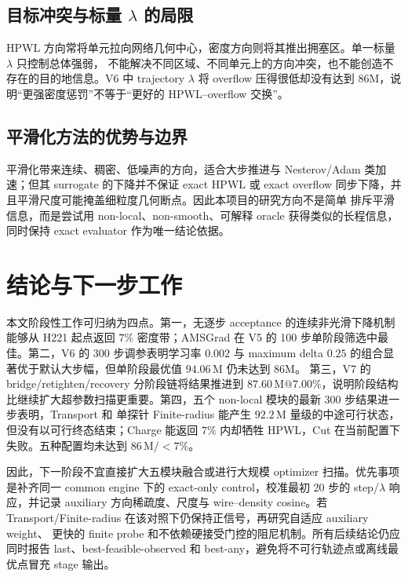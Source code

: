 \documentclass[UTF8,a4paper,11pt]{ctexart}
\begin{document}
\subsection{目标冲突与标量 \texorpdfstring{$\lambda$}{lambda} 的局限}

HPWL 方向常将单元拉向网络几何中心，密度方向则将其推出拥塞区。单一标量 $\lambda$ 只控制总体强弱，
不能解决不同区域、不同单元上的方向冲突，也不能创造不存在的目的地信息。V6 中 trajectory $\lambda$ 将
overflow 压得很低却没有达到 86M，说明“更强密度惩罚”不等于“更好的 HPWL--overflow 交换”。

\subsection{平滑化方法的优势与边界}

平滑化带来连续、稠密、低噪声的方向，适合大步推进与 Nesterov/Adam 类加速；但其 surrogate 的下降并不保证
exact HPWL 或 exact overflow 同步下降，并且平滑尺度可能掩盖细粒度几何断点。因此本项目的研究方向不是简单
排斥平滑信息，而是尝试用 non-local、non-smooth、可解释 oracle 获得类似的长程信息，同时保持 exact evaluator
作为唯一结论依据。

\section{结论与下一步工作}

本文阶段性工作可归纳为四点。第一，无逐步 acceptance 的连续非光滑下降机制能够从 H221 起点返回 $7\%$
密度带；AMSGrad 在 V5 的 100 步单阶段筛选中最佳。第二，V6 的 300 步调参表明学习率 $0.002$ 与
maximum delta $0.25$ 的组合显著优于默认大步幅，但单阶段最优值 $94.06\,\mathrm{M}$ 仍未达到 86M。
第三，V7 的 bridge/retighten/recovery 分阶段链将结果推进到 $87.60\,\mathrm{M}@7.00\%$，说明阶段结构
比继续扩大超参数扫描更重要。第四，五个 non-local 模块的最新 300 步结果进一步表明，Transport 和
单探针 Finite-radius 能产生 $92.2\,\mathrm{M}$ 量级的中途可行状态，但没有以可行终态结束；Charge 能返回
$7\%$ 内却牺牲 HPWL，Cut 在当前配置下失败。五种配置均未达到 $86\,\mathrm{M}/<7\%$。

因此，下一阶段不宜直接扩大五模块融合或进行大规模 optimizer 扫描。优先事项是补齐同一 common engine 下的
exact-only control，校准最初 20 步的 step/$\lambda$ 响应，并记录 auxiliary 方向稀疏度、尺度与
wire--density cosine。若 Transport/Finite-radius 在该对照下仍保持正信号，再研究自适应 auxiliary weight、
更快的 finite probe 和不依赖硬接受门控的阻尼机制。所有后续结论仍应同时报告 last、best-feasible-observed
和 best-any，避免将不可行轨迹点或离线最优点冒充 stage 输出。
\end{document}
